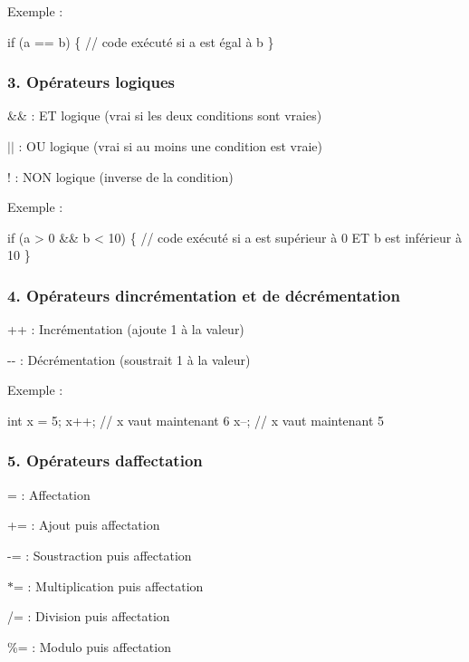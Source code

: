 Exemple \+: 
\begin{DoxyCode}
\textcolor{keywordflow}{if} (a == b) \{
    \textcolor{comment}{// code exécuté si a est égal à b}
\}
\end{DoxyCode}


\subsubsection*{3. Opérateurs logiques}


\begin{DoxyItemize}
\item {\ttfamily \&\&} \+: ET logique (vrai si les deux conditions sont vraies)
\item {\ttfamily $\vert$$\vert$} \+: OU logique (vrai si au moins une condition est vraie)
\item {\ttfamily !} \+: N\+ON logique (inverse de la condition)
\end{DoxyItemize}

Exemple \+: 
\begin{DoxyCode}
\textcolor{keywordflow}{if} (a > 0 && b < 10) \{
    \textcolor{comment}{// code exécuté si a est supérieur à 0 ET b est inférieur à 10}
\}
\end{DoxyCode}


\subsubsection*{4. Opérateurs d\textquotesingle{}incrémentation et de décrémentation}


\begin{DoxyItemize}
\item {\ttfamily ++} \+: Incrémentation (ajoute 1 à la valeur)
\item {\ttfamily -\/-\/} \+: Décrémentation (soustrait 1 à la valeur)
\end{DoxyItemize}

Exemple \+: 
\begin{DoxyCode}
\textcolor{keywordtype}{int} x = 5;
x++;  \textcolor{comment}{// x vaut maintenant 6}
x--;  \textcolor{comment}{// x vaut maintenant 5}
\end{DoxyCode}


\subsubsection*{5. Opérateurs d\textquotesingle{}affectation}


\begin{DoxyItemize}
\item {\ttfamily =} \+: Affectation
\item {\ttfamily +=} \+: Ajout puis affectation
\item {\ttfamily -\/=} \+: Soustraction puis affectation
\item {\ttfamily $\ast$=} \+: Multiplication puis affectation
\item {\ttfamily /=} \+: Division puis affectation
\item {\ttfamily \%=} \+: Modulo puis affectation
\end{DoxyItemize}

